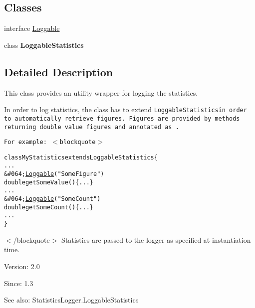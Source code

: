 \subsection*{Classes}
\begin{CompactItemize}
\item 
interface \hyperlink{interfacejenes_1_1statistics_1_1_statistics_logger_1_1_loggable}{Loggable}
\item 
class \textbf{LoggableStatistics}
\end{CompactItemize}


\subsection{Detailed Description}
This class provides an utility wrapper for logging the statistics.

In order to log statistics, the class has to extend {\tt LoggableStatistics{\tt  in order to automatically retrieve figures. Figures are provided by methods returning {\tt double} value figures and annotated as {\tt {\tt .}}}}

{\tt {\tt {\tt {\tt  For example: $<$blockquote$>$\small\begin{alltt}
 class MyStatistics extends LoggableStatistics \{
    ...
    \&\#064;\hyperlink{interfacejenes_1_1statistics_1_1_statistics_logger_1_1_loggable}{Loggable}("SomeFigure")
    double getSomeValue() \{ ... \}
    ...
    \&\#064;\hyperlink{interfacejenes_1_1statistics_1_1_statistics_logger_1_1_loggable}{Loggable}("SomeCount")
    double getSomeCount() \{ ... \}
    ...
 \}
 
 \end{alltt}
\normalsize 
$<$/blockquote$>$ Statistics are passed to the logger as specified at instantiation time.}}}}

{\tt {\tt {\tt {\tt  \begin{Desc}
\item[Version:]2.0 \end{Desc}
\begin{Desc}
\item[Since:]1.3\end{Desc}
\begin{Desc}
\item[See also:]StatisticsLogger.LoggableStatistics \end{Desc}
}}}}

